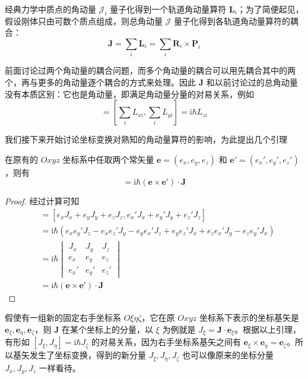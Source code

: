 \documentclass[cn,10pt,math=newtx,citestyle=gb7714-2015,bibstyle=gb7714-2015]{elegantbook}
\def\bm{\boldsymbol}
\def\mc{\mathcal}
\def\i{\mathrm i}
\begin{document}
经典力学中质点的角动量 $\mc J_i$ 量子化得到一个轨道角动量算符 $\bm L_i$；为了简便起见，假设刚体只由可数个质点组成，则总角动量 $\mc J$ 量子化得到各轨道角动量算符的耦合：
\begin{equation}
    \bm J = \sum_i\bm L_i = \sum_i\bm R_i\times\bm P_i
\end{equation}

前面讨论过两个角动量的耦合问题，而多个角动量的耦合可以用先耦合其中的两个，再与更多的角动量逐个耦合的方式来处理。因此 $\bm J$ 和以前讨论过的总角动量没有本质区别：它也是角动量，即满足角动量分量的对易关系，例如
\begin{equation}
    [J_x,J_y] = \left[\sum_i L_{xi},\sum_i L_{yi}\right] = \i\hbar L_{zi}
\end{equation}

我们接下来开始讨论坐标变换对熟知的角动量算符的影响，为此提出几个引理
\begin{lemma}[角动量在某固定方向上分量的对易关系]
   在原有的 $Oxyz$ 坐标系中任取两个常矢量 $\bm e=(e_x,e_y,e_z)$ 和 $\bm e' = (e_x',e_y',e_z')$，则有
   \begin{equation}
       [\bm J\cdot\bm e,\bm J\cdot\bm e'] = \i\hbar(\bm e\times\bm e')\cdot\bm J
   \end{equation}
\end{lemma}
\begin{proof}
    经过计算可知
    \begin{align}
        [\bm J\cdot\bm e,\bm J\cdot\bm e']& = [e_xJ_x+e_yJ_y+e_zJ_z, e_x'J_x+e_y'J_y+e_z'J_z]\nonumber\\
        & = \i\hbar(e_xe_y'J_z-e_xe_z'J_y-e_ye_x'J_z+e_ye_z'J_x+e_ze_x'J_y-e_ze_y'J_x)\nonumber\\
        & = \i\hbar\begin{vmatrix}J_x & J_y & J_z\\ e_x & e_y & e_z\\ e_x' & e_y' & e_z'
        \end{vmatrix}\nonumber\\
        & = \i\hbar(\bm e\times \bm e')\cdot\bm J
    \end{align}
\end{proof}

假使有一组新的固定右手坐标系 $O\xi\eta\zeta$，它在原 $Oxyz$ 坐标系下表示的坐标基矢是 $\bm e_\xi,\bm e_\eta,\bm e_\zeta$，则 $\bm J$ 在某个坐标上的分量，以 $\xi$ 为例就是 $J_\xi = \bm J\cdot\bm e_\xi$。根据以上引理，有形如 $[J_\xi,J_\eta] = \i\hbar J_\zeta$ 的对易关系，因为右手坐标系基矢之间有 $\bm e_\xi\times\bm e_\eta = \bm e_\zeta$。所以基矢发生了坐标变换，得到的新分量 $J_\xi,J_\eta,J_\zeta$ 也可以像原来的坐标分量 $J_x,J_y,J_z$ 一样看待。
\end{document}
